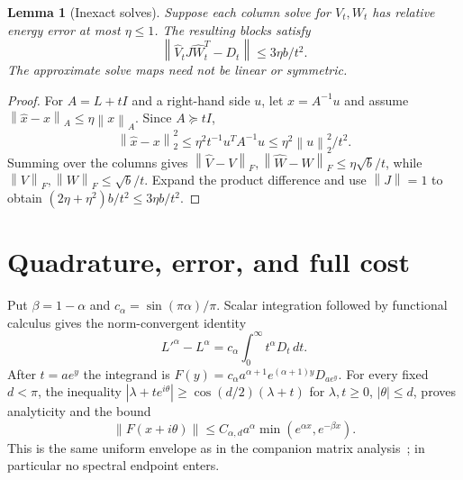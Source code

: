 \documentclass[11pt]{article}
\newtheorem{lemma}[theorem]{Lemma}
\newcommand{\norm}[1]{\left\lVert#1\right\rVert}
\begin{document}
\begin{lemma}[Inexact solves]\label{lem:solve}
Suppose each column solve for $V_t,W_t$ has relative energy error at
most $\eta\le1$. The resulting blocks satisfy
\[
 \norm{\widehat V_tJ\widehat W_t^T-D_t}
          \le 3\eta b/t^2.
\]
The approximate solve maps need not be linear or symmetric.
\end{lemma}
\begin{proof}
For $A=L+tI$ and a right-hand side $u$, let $x=A^{-1}u$ and assume
$\norm{\widehat x-x}_A\le\eta\norm{x}_A$. Since $A\succeq tI$,
\[
 \norm{\widehat x-x}_2^2
 \le\eta^2t^{-1}u^TA^{-1}u\le\eta^2\norm u_2^2/t^2.
\]
Summing over the columns gives
$\norm{\widehat V-V}_F,\norm{\widehat W-W}_F\le\eta\sqrt b/t$,
while $\norm V_F,\norm W_F\le\sqrt b/t$.
Expand the product difference and use $\norm J=1$ to obtain
$(2\eta+\eta^2)b/t^2\le3\eta b/t^2$.
\end{proof}

\section{Quadrature, error, and full cost}
Put $\beta=1-\alpha$ and $c_\alpha=\sin(\pi\alpha)/\pi$.
Scalar integration followed by functional calculus gives the norm-convergent
identity
\begin{equation}\label{eq:integral}
 L'^\alpha-L^\alpha=c_\alpha\int_0^\infty t^\alpha D_t\,dt.
\end{equation}
After $t=ae^y$ the integrand is
$F(y)=c_\alpha a^{\alpha+1}e^{(\alpha+1)y}D_{ae^y}$.
For every fixed $d<\pi$, the inequality
$|\lambda+te^{i\theta}|\ge\cos(d/2)(\lambda+t)$ for
$\lambda,t\ge0$, $|\theta|\le d$, proves analyticity and the bound
\begin{equation}\label{eq:envelope}
 \norm{F(x+i\theta)}\le C_{\alpha,d}a^\alpha
                 \min(e^{\alpha x},e^{-\beta x}).
\end{equation}
This is the same uniform envelope as in the companion matrix
analysis~\cite{Companion}; in particular no spectral endpoint enters.
\end{document}
